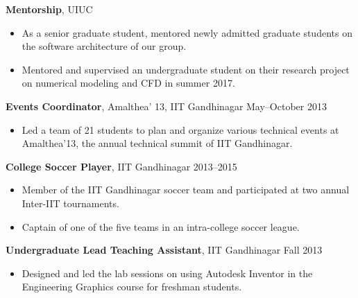 \documentclass[margin]{res}
\begin{document}
\begin{resume}
{\bf Mentorship}, UIUC
\begin{itemize}
	\item As a senior graduate student, mentored newly admitted graduate students on the software architecture of our group.
	\item Mentored and supervised an undergraduate student on their research project on numerical modeling and CFD in summer 2017.
\end{itemize}

{\bf Events Coordinator}, Amalthea' 13, IIT Gandhinagar \hfill May--October 2013
\begin{itemize}
	\item Led a team of 21 students to plan and organize various technical events at Amalthea'13, the annual technical summit of IIT Gandhinagar.
\end{itemize}

{\bf College Soccer Player}, IIT Gandhinagar \hfill 2013--2015
\begin{itemize}
	\item Member of the IIT Gandhinagar soccer team and participated at two annual Inter-IIT tournaments.
	\item Captain of one of the five teams in an intra-college soccer league.
\end{itemize}

{\bf Undergraduate Lead Teaching Assistant}, IIT Gandhinagar \hfill Fall 2013
\begin{itemize}
	\item Designed and led the lab sessions on using Autodesk Inventor in the Engineering Graphics course for freshman students.
\end{itemize}

%
%

\end{resume}
\end{document}
